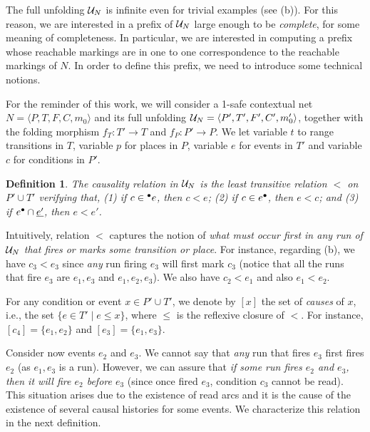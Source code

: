 \documentclass[11pt,a4paper]{article}
\newtheorem{definition}[theorem]{Definition}
\begin{document}
The full unfolding $\mathcal{U}_{N}$ is infinite even for trivial examples (see
 (b)).  For this reason, we are interested in a prefix of $\mathcal{U}_{N}$ large enough to be \emph{complete}, for some meaning of completeness.  In
particular, we are interested in computing a prefix whose reachable markings
are in one to one correspondence to the reachable markings of $N$.  In order to
define this prefix, we need to introduce some technical notions.  

For the reminder of this work, we will consider a 1-safe contextual net $N =
\langle P, T, F, C, m_0 \rangle$ and its full unfolding $\mathcal{U}_{N} = \langle P',
T', F', C', m'_0 \rangle$, together with the folding morphism $f_T : T' \to T$
and $f_P : P' \to P$.  We let variable $t$ to range transitions in $T$,
variable $p$ for places in $P$, variable $e$ for events in $T'$ and variable
$c$ for conditions in $P'$.

\begin{definition}
\label{def:causality.relation}
The \emph{causality relation} in $\mathcal{U}_{N}$ is the least transitive relation $<$
on $P' \cup T'$ verifying that, (1) if $c \in {}^\bullet e$, then $c < e$; (2) if $c
\in e^\bullet$, then $e < c$; and (3) if $e^\bullet \cap \underline{e'}$, then $e < e'$.
\end{definition}

Intuitively, relation $<$ captures the notion of \textit{what must occur first
in \emph{any} run of $\mathcal{U}_{N}$ that fires or marks some transition or place}.
For instance, regarding  (b), we have $c_3 < e_3$ since
\emph{any} run firing $e_3$ will first mark $c_3$ (notice that all the runs
that fire $e_3$ are $e_1, e_3$ and $e_1, e_2, e_3$).  We also have $c_2 < e_1$
and also $e_1 < e_2$.

For any condition or event $x \in P' \cup T'$, we denote by $[x]$ the set of
\emph{causes} of $x$, i.e., the set $\{e \in T' \mid e \le x\}$, where $\le$ is
the reflexive closure of $<$.  For instance, $[c_4] = \{e_1, e_2\}$ and $[e_3]
= \{e_1, e_3\}$.

Consider now events $e_2$ and $e_3$.  We cannot say that \emph{any} run that
fires $e_3$ first fires $e_2$ (as $e_1, e_3$ is a run).  However, we can assure
that \emph{if some run fires $e_2$ and $e_3$, then it will fire $e_2$ before
$e_3$} (since once fired $e_3$, condition $c_3$ cannot be read).  This
situation arises due to the existence of read arcs and it is the cause of the
existence of several causal histories for some events.  We characterize this
relation in the next definition.
\end{document}
